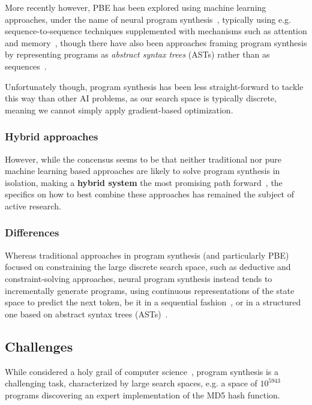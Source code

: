 \documentclass{article}
\begin{document}
More recently however, PBE has been explored using machine learning approaches, under the name of neural program synthesis~\citep{nps},
typically using e.g. sequence-to-sequence techniques supplemented with mechanisms such as attention and memory~\citep{nps},
though there have also been approaches framing program synthesis by representing programs as \emph{abstract syntax trees} (ASTs) rather than as sequences~\citep{nps,odena2020learning}.

Unfortunately though, program synthesis has been less straight-forward to tackle this way than other AI problems,
as our search space is typically discrete, meaning we cannot simply apply gradient-based optimization.~\citep{nps}

\subsubsection{Hybrid approaches}

However, while the concensus seems to be that neither traditional nor pure machine learning based approaches are likely to solve program synthesis in isolation,
making a \textbf{hybrid system} the most promising path forward~\citep{nps},
the specifics on how to best combine these approaches has remained the subject of active research.

\subsubsection{Differences} %

Whereas traditional approaches in program synthesis (and particularly PBE) focused on constraining the large discrete search space,
such as deductive and constraint-solving approaches,
neural program synthesis instead tends to incrementally generate programs,
using continuous representations of the state space to predict the next token,
be it in a sequential fashion~\citep{alphanpi},
or in a structured one based on abstract syntax trees (ASTs)~\citep{nsps}.

\subsection{Challenges}

While considered a holy grail of computer science~\citep{gulwani2017program}, program synthesis is a challenging task, characterized by large search spaces,
e.g. a space of $10^{5943}$ programs discovering an expert implementation of the MD5 hash function.~\cite{gulwani2017program}
\end{document}
